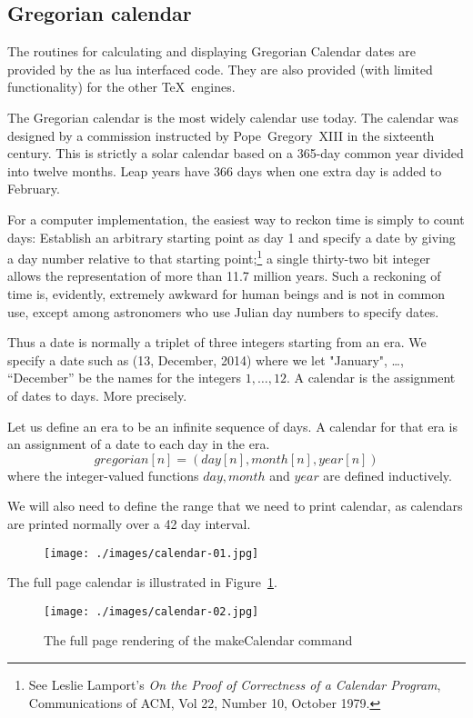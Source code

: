 \subsection{Gregorian calendar}

The routines for calculating and displaying Gregorian Calendar dates are provided by 
the  as lua interfaced code. They are also provided (with limited functionality) for the other \TeX\ engines.

The Gregorian calendar is the most widely calendar use today. The calendar was designed by a commission instructed by Pope~Gregory~XIII in the sixteenth century. This is strictly a solar calendar based on a 365-day common year divided into twelve months. Leap years have 366 days when one extra day is added to February.

For a computer implementation, the easiest way to reckon time is simply to count
days: Establish an arbitrary starting point as day 1 and specify a date by giving
a day number relative to that starting point;\footnote{See Leslie Lamport's \textit{On the Proof of Correctness of a Calendar Program}, Communications of ACM, Vol 22, Number 10, October 1979.} a single thirty-two bit integer allows
the representation of more than 11.7 million years. Such a reckoning of time is, evidently, extremely awkward for human beings and is not in common use, except among astronomers who use Julian day numbers to specify dates.

Thus a date is normally a triplet of three integers starting from an era. We specify a date such as (13, December, 2014) where we let "January", \ldots, ``December'' be the names for the integers $1,\ldots,12$. A calendar is the assignment of dates to days.  More precisely.

Let us define an era to be an infinite sequence of days. A calendar for that era is an assignment of a date to each day in the era. 
\[gregorian[n] = (day[n], month[n], year[n])\]
where the integer-valued functions $day, month$ and $year$ are defined inductively.

We will also need to define the range that we need to print calendar, as calendars are printed normally over a 42 day interval.

\begin{figure}[h]
\centering
\texttt{[image: ./images/calendar-01.jpg]}
\end{figure}

The full page calendar is illustrated in Figure~\ref{girlcalendar}.
\begin{figure}[htb]
\centering
\texttt{[image: ./images/calendar-02.jpg]}
\caption{The full page rendering of the makeCalendar command}
\label{girlcalendar}
\end{figure}

